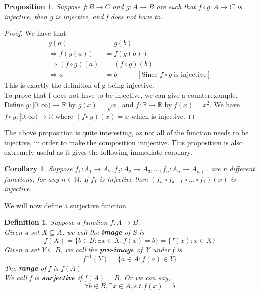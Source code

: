 \documentclass{book}
\newtheorem{definition}[theorem]{Definition}
\newtheorem{corollary}[theorem]{Corollary}
\newtheorem{proposition}[theorem]{Proposition}
\begin{document}
\begin{proposition} \label{Proposition 1.2.9}
    Suppose $f : B \rightarrow C$ and $g : A \rightarrow B$ are such that $f \circ g : A \rightarrow C$ is injective, then g is injective, and f does not have to.
\end{proposition}

\begin{proof}
    We have that
    \begin{align*}
        g(a) & = g(b) \\
        \Rightarrow f(g(a)) & = f(g(b)) \\
        \Rightarrow (f \circ g)(a) & = (f \circ g)(b) \\
        \Rightarrow a & = b \ \ \ \ \ \ \ \ \ \ \ \ \ [\text{Since } f \circ g \text{ is injective}]
    \end{align*}
    This is exactly the definition of g being injective. \\
    To prove that f does not have to be injective, we can give a counterexample. \\
    Define $g : [0, \infty) \rightarrow \mathbb{R}$ by $g(x) = \sqrt{x}$, and $f : \mathbb{R} \rightarrow \mathbb{R}$ by $f(x) = x^{2}$. We have $f \circ g : [0, \infty) \rightarrow \mathbb{R}$ where $(f \circ g)(x) = x$ which is injective.
\end{proof}

The above proposition is quite interesting, as not all of the function needs to be injective, in order to make the composition innjective. This proposition is also extremely useful as it gives the following immediate corollary.
\begin{corollary}
    Suppose $f_{1} : A_{1} \rightarrow A_{2}, f_{2} : A_{2} \rightarrow A_{3}, ..., f_{n} : A_{n} \rightarrow A_{n+1}$ are n different functions, for any $n \in \mathbb{N}$. If $f_{1}$ is injective then $(f_{n} \circ f_{n-1} \circ ... \circ f_{1})(x)$ is injective.
\end{corollary}

We will now define a surjective function
\begin{definition}
    Suppose a function $f : A \rightarrow B$. \\
    Given a set $X \subseteq A$, we call the \textbf{image} of S is
    $$f(X) = \{b \in B : \exists x \in X, f(x) = b \} = \{f(x) : x \in X \}$$
    Given a set $Y \subseteq B$, we call the \textbf{pre-image} of Y under f is
    $$f^{-1}(Y) = \{a \in A : f(a) \in Y\}$$
    The \textbf{range} of f is $f(A)$ \\
    We call f is \textbf{surjective} if $f(A) = B$. Or we can say,
    $$\forall b \in B, \exists x \in A, s.t. f(x) = b$$
\end{definition}
\end{document}
